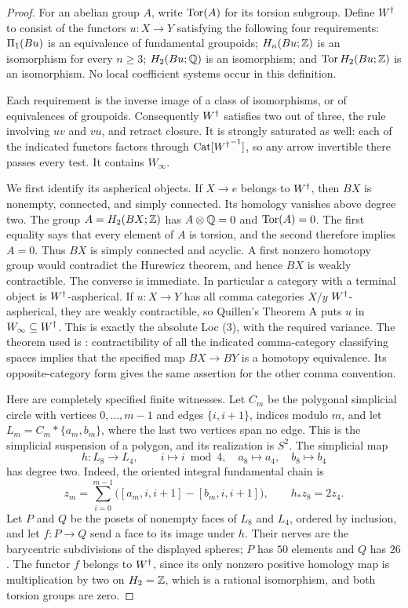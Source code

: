 \begin{proof}
For an abelian group $A$, write $\operatorname{Tor}(A)$ for its torsion subgroup. Define ${W^{\dagger}}$ to consist of the functors $u:X\to Y$ satisfying the following four requirements: $\Pi_1(Bu)$ is an equivalence of fundamental groupoids; $H_n(Bu;\mathbb Z)$ is an isomorphism for every $n\geq3$; $H_2(Bu;\mathbb Q)$ is an isomorphism; and $\operatorname{Tor} H_2(Bu;\mathbb Z)$ is an isomorphism. No local coefficient systems occur in this definition.

Each requirement is the inverse image of a class of isomorphisms, or of equivalences of groupoids. Consequently ${W^{\dagger}}$ satisfies two out of three, the rule involving $uv$ and $vu$, and retract closure. It is strongly saturated as well: each of the indicated functors factors through $\mathrm{Cat}[{W^{\dagger}}^{-1}]$, so any arrow invertible there passes every test. It contains $W_\infty$.

We first identify its aspherical objects. If $X\to e$ belongs to ${W^{\dagger}}$, then $BX$ is nonempty, connected, and simply connected. Its homology vanishes above degree two. The group $A=H_2(BX;\mathbb Z)$ has $A\otimes\mathbb Q=0$ and $\operatorname{Tor}(A)=0$. The first equality says that every element of $A$ is torsion, and the second therefore implies $A=0$. Thus $BX$ is simply connected and acyclic. A first nonzero homotopy group would contradict the Hurewicz theorem, and hence $BX$ is weakly contractible. The converse is immediate. In particular a category with a terminal object is ${W^{\dagger}}$-aspherical. If $u:X\to Y$ has all comma categories $X/y$ ${W^{\dagger}}$-aspherical, they are weakly contractible, so Quillen's Theorem A puts $u$ in $W_\infty\subseteq{W^{\dagger}}$. This is exactly the absolute Loc (3), with the required variance. The theorem used is \cite[\S1, Theorem A]{FGHQuillen1973}: contractibility of all the indicated comma-category classifying spaces implies that the specified map $BX\to BY$ is a homotopy equivalence. Its opposite-category form gives the same assertion for the other comma convention.

Here are completely specified finite witnesses. Let $C_m$ be the polygonal simplicial circle with vertices $0,\ldots,m-1$ and edges $\{i,i+1\}$, indices modulo $m$, and let $L_m=C_m*\{a_m,b_m\}$, where the last two vertices span no edge. This is the simplicial suspension of a polygon, and its realization is $S^2$. The simplicial map
\[
 h:L_8\longrightarrow L_4,
 \qquad i\longmapsto i\bmod4,
 \quad a_8\longmapsto a_4,
 \quad b_8\longmapsto b_4
\]
has degree two. Indeed, the oriented integral fundamental chain is
\[
 z_m=\sum_{i=0}^{m-1}\bigl([a_m,i,i+1]-[b_m,i,i+1]\bigr),
 \qquad h_*z_8=2z_4.
\]
Let $P$ and $Q$ be the posets of nonempty faces of $L_8$ and $L_4$, ordered by inclusion, and let $f:P\to Q$ send a face to its image under $h$. Their nerves are the barycentric subdivisions of the displayed spheres; $P$ has $50$ elements and $Q$ has $26$. The functor $f$ belongs to ${W^{\dagger}}$, since its only nonzero positive homology map is multiplication by two on $H_2=\mathbb Z$, which is a rational isomorphism, and both torsion groups are zero.


\end{proof}
